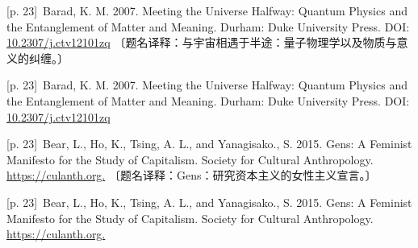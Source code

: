 \documentclass[10pt,a4paper]{article}
\begin{document}
\noindent\begin{minipage}{\textwidth}\begin{minipage}[t]{\dimexpr.5\textwidth-4mm\relax}\noindent\begin{minipage}[t]{\linewidth}{\scriptsize\color{gray} [p. 23]}\ Barad, K. M. 2007. Meeting the Universe Halfway: Quantum Physics and the Entanglement of Matter and Meaning. Durham: Duke University Press. DOI: \url{10.2307/j.ctv12101zq} 〔题名译释：与宇宙相遇于半途：量子物理学以及物质与意义的纠缠。〕\par\end{minipage}\par\end{minipage}\hfill\begin{minipage}[t]{\dimexpr.5\textwidth-4mm\relax}\noindent\begin{minipage}[t]{\linewidth}{\scriptsize\color{gray} [p. 23]}\ Barad, K. M. 2007. Meeting the Universe Halfway: Quantum Physics and the Entanglement of Matter and Meaning. Durham: Duke University Press. DOI: \url{10.2307/j.ctv12101zq}\par\end{minipage}\par\end{minipage}\end{minipage}\par
\noindent\begin{minipage}{\textwidth}\begin{minipage}[t]{\dimexpr.5\textwidth-4mm\relax}\noindent\begin{minipage}[t]{\linewidth}{\scriptsize\color{gray} [p. 23]}\ Bear, L., Ho, K., Tsing, A. L., and Yanagisako., S. 2015. Gens: A Feminist Manifesto for the Study of Capitalism. Society for Cultural Anthropology. \url{https://culanth.org.} 〔题名译释：Gens：研究资本主义的女性主义宣言。〕\par\end{minipage}\par\end{minipage}\hfill\begin{minipage}[t]{\dimexpr.5\textwidth-4mm\relax}\noindent\begin{minipage}[t]{\linewidth}{\scriptsize\color{gray} [p. 23]}\ Bear, L., Ho, K., Tsing, A. L., and Yanagisako., S. 2015. Gens: A Feminist Manifesto for the Study of Capitalism. Society for Cultural Anthropology. \url{https://culanth.org.}\par\end{minipage}\par\end{minipage}\end{minipage}\par
\end{document}
